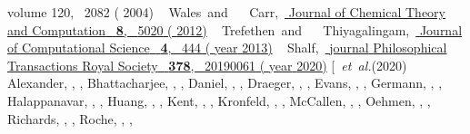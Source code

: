 \documentclass[twocolumn,10pt]{revtex4-2}
\begin{document}
\begin{thebibliography}{46}
{{  {volume} {120}},\  {2082} (
  {2004})}%
%
  \BibitemOpen
   { {\ \bibnamefont
  {Wales}}\ and\  {\ \bibnamefont
  {Carr}},\ }\href {https://doi.org/10.1021/ct3004832} {
  { {Journal of Chemical Theory and Computation}\ }\textbf
  { {8}},\  {5020} (
  {2012})}%
%
  \BibitemOpen
   { {\ \bibnamefont
  {Trefethen}}\ and\  {~\bibnamefont
  {Thiyagalingam}},\ }\href {https://doi.org/10.1016/j.jocs.2013.01.005}
  { { {Journal of Computational
  Science}\ }\textbf { {4}},\  {444} (\bibinfo
  {year} {2013})}%
%
  \BibitemOpen
   { {~\bibnamefont
  {Shalf}},\ }\href {https://doi.org/10.1098/rsta.2019.0061} {\bibfield
  {journal} { {Philosophical Transactions Royal Society}\
  }\textbf { {378}},\  {20190061} (\bibinfo
  {year} {2020})}\BibitemShut {NoStop}%
\bibitem [{\ \emph {et~al.}(2020)\citenamefont
  {Alexander}, \citenamefont {Almgren}, \citenamefont {Bell}, \citenamefont
  {Bhattacharjee}, \citenamefont {Chen}, \citenamefont {Colella}, \citenamefont
  {Daniel}, \citenamefont {DeSlippe}, \citenamefont {Diachin}, \citenamefont
  {Draeger}, \citenamefont {Dubey}, \citenamefont {Dunning}, \citenamefont
  {Evans}, \citenamefont {Foster}, \citenamefont {Francois}, \citenamefont
  {Germann}, \citenamefont {Gordon}, \citenamefont {Habib}, \citenamefont
  {Halappanavar}, \citenamefont {Hamilton}, \citenamefont {Hart}, \citenamefont
  {Huang}, \citenamefont {Hungerford}, \citenamefont {Kasen}, \citenamefont
  {Kent}, \citenamefont {Kolev}, \citenamefont {Kothe}, \citenamefont
  {Kronfeld}, \citenamefont {Luo}, \citenamefont {Mackenzie}, \citenamefont
  {McCallen}, \citenamefont {Messer}, \citenamefont {Mniszewski}, \citenamefont
  {Oehmen}, \citenamefont {Perazzo}, \citenamefont {Perez}, \citenamefont
  {Richards}, \citenamefont {Rider}, \citenamefont {Rieben}, \citenamefont
  {Roche}, \citenamefont {Siegel}, \citenamefont {Sprague}, \citenamefont
}
\end{thebibliography}
\end{document}
